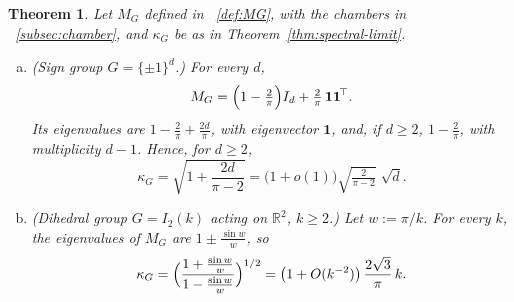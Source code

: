 \documentclass[11pt]{article}
\newcommand{\R}{\mathbb{R}}
\newtheorem{theor}{Theorem}[section]
\theoremstyle{definition}
\begin{document}
\begin{theor}
	\label{thm:exact}
	Let $M_G$ defined in ~\ref{def:MG}, with the chambers in ~\ref{subsec:chamber}, and  $\kappa_G$ be as in Theorem~\ref{thm:spectral-limit}.
	\begin{enumerate}[(a)]
		\item \emph{(Sign group $G=\{\pm1\}^d$.)} For every $d$,
		\[
		M_G=\Bigl(1-\tfrac2\pi\Bigr)I_d+\tfrac2\pi\,\mathbf 1\mathbf 1^{\!\top}.
		\]
		Its eigenvalues are $1-\tfrac2\pi+\tfrac{2d}\pi$, with eigenvector $\mathbf 1$, and,
		if $d\ge2$, $1-\tfrac2\pi$, with multiplicity $d-1$. Hence, for $d\ge2$,
		\[
		\kappa_G=\sqrt{1+\frac{2d}{\pi-2}}
		=\bigl(1+o(1)\bigr)\sqrt{\tfrac{2}{\pi-2}}\;\sqrt d .
		\]

		\item \emph{(Dihedral group $G=I_2(k)$ acting on $\R^2$, $k\ge2$.)}
		Let $w:=\pi/k$. For every $k$, the eigenvalues of $M_G$ are $1\pm\frac{\sin w}{w}$, so
		\[
		\kappa_G=\Bigl(\frac{1+\tfrac{\sin w}{w}}{1-\tfrac{\sin w}{w}}\Bigr)^{1/2}
		=\bigl(1+O(k^{-2})\bigr)\,\frac{2\sqrt3}{\pi}\,k .
		\]
	\end{enumerate}
\end{theor}
\end{document}

